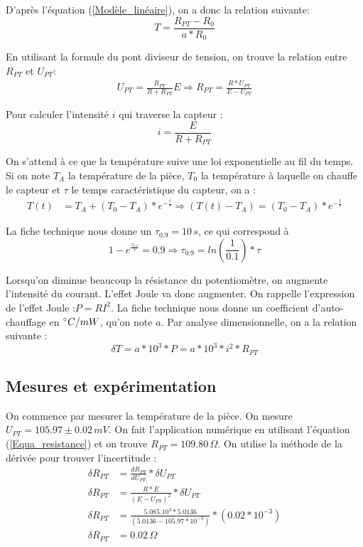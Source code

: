 \documentclass[12pt]{article}
\begin{document}
D'après l'équation (\ref{Modèle_linéaire}), on a donc la relation suivante:
\begin{equation}
T=\frac{R_{PT}-R_0}{a*R_0}
\label{Equation_température}
\end{equation}

En utilisant la formule du pont diviseur de tension, on trouve la relation entre $R_{PT}$ et $U_{PT}$:
\begin{align}
U_{PT}=\frac{R_{PT}}{R+R_{PT}}E \Rightarrow R_{PT}=\frac{R*U_{PT}}{E-U_{PT}}
\label{Equa_resistance}
\end{align}

Pour calculer l'intensité $i$ qui traverse la capteur : 
\begin{equation}
i=\frac{E}{R+R_{PT}}
\label{Equa_intensité}
\end{equation}

On s'attend à ce que la température suive une loi exponentielle au fil du temps. Si on note $T_A$ la température de la pièce, $T_0$ la température à laquelle on chauffe le capteur et $\tau$ le temps caractéristique du capteur, on a :
\begin{align}
T(t)&=T_A+(T_0-T_A)*e^{-\frac{t}{\tau}}\Rightarrow
(T(t)-T_A)=(T_0-T_A)*e^{-\frac{t}{\tau}}
\label{exponentielle}
\end{align}   

La fiche technique nous donne un $\tau_{0.9}=10\, s$, ce qui correspond à 
\begin{equation}
1-e^{\frac{\tau_{0.9}}{\tau}}=0.9 \Rightarrow \tau_{0.9}=ln(\frac{1}{0.1})*\tau
\label{Equa_tempsréponse}
\end{equation}

Lorsqu'on diminue beaucoup la résistance du potentiomètre, on augmente l'intensité du courant. L'effet Joule va donc augmenter. On rappelle l'expression de l'effet Joule :$P=RI^2$. La fiche technique nous donne un coefficient d'auto-chauffage en $\degree C/mW$, qu'on note $a$. Par analyse dimensionnelle, on a la relation suivante :
\begin{equation}
\delta T=a*10^{3}*P=a*10^{3}*i^2*R_{PT}
\label{Equation_puissance}
\end{equation}



\subsection{Mesures et expérimentation}

On commence par mesurer la température de la pièce. On mesure $U_{PT}=105.97\pm 0.02\, mV$. On fait l'application numérique en utilisant l'équation (\ref{Equa_resistance}) et on trouve $R_{PT}=109.80\, \Omega$. On utilise la méthode de la dérivée pour trouver l'incertitude :
\begin{align*}
\delta R_{PT}&=\frac{dR_{PT}}{dU_{PT}}*\delta U_{PT} \\
\delta R_{PT}&=\frac{R*E}{(E-U_{PT})^2}*\delta U_{PT} \\
\delta R_{PT}&=\frac{5.085.10^{3}*5.0136}{(5.0136-105.97*10^{-3})}*(0.02*10^{-3})\\
\delta R_{PT}&=0.02\, \Omega
\end{align*}
\end{document}
